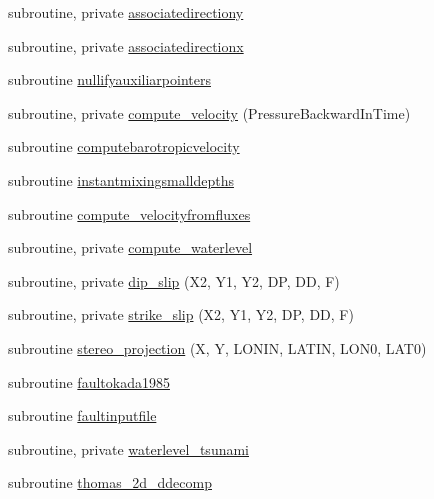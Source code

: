 \begin{DoxyCompactItemize}
subroutine, private \mbox{\hyperlink{namespacemodulehydrodynamic_ad1dd8c0a50f0deaee0d084b9938b1361}{associatedirectiony}}
\item 
subroutine, private \mbox{\hyperlink{namespacemodulehydrodynamic_a46e9869092f2ae2a7161f224fb8929e7}{associatedirectionx}}
\item 
subroutine \mbox{\hyperlink{namespacemodulehydrodynamic_a43c5994c86b411881eec077d6376cb07}{nullifyauxiliarpointers}}
\item 
subroutine, private \mbox{\hyperlink{namespacemodulehydrodynamic_aba4d9045d33fdc1b7b6011fd3fbb9c28}{compute\+\_\+velocity}} (Pressure\+Backward\+In\+Time)
\item 
subroutine \mbox{\hyperlink{namespacemodulehydrodynamic_a4ced11a2f90a07418b9497e7e9b068b7}{computebarotropicvelocity}}
\item 
subroutine \mbox{\hyperlink{namespacemodulehydrodynamic_a2237f44be04f4c5aeac0890ddec1ce4b}{instantmixingsmalldepths}}
\item 
subroutine \mbox{\hyperlink{namespacemodulehydrodynamic_a264a587e27769271754a3a3a8979a9b8}{compute\+\_\+velocityfromfluxes}}
\item 
subroutine, private \mbox{\hyperlink{namespacemodulehydrodynamic_abe745b3932a59db4111fe2798a0c335d}{compute\+\_\+waterlevel}}
\item 
subroutine, private \mbox{\hyperlink{namespacemodulehydrodynamic_a95f2fab061ef070b4278d48f1e7028e2}{dip\+\_\+slip}} (X2, Y1, Y2, DP, DD, F)
\item 
subroutine, private \mbox{\hyperlink{namespacemodulehydrodynamic_a38a2568403edbdf1d10000f553f39252}{strike\+\_\+slip}} (X2, Y1, Y2, DP, DD, F)
\item 
subroutine \mbox{\hyperlink{namespacemodulehydrodynamic_a1d685e489f857af3dd0c69835d0b081d}{stereo\+\_\+projection}} (X, Y, L\+O\+N\+IN, L\+A\+T\+IN, L\+O\+N0, L\+A\+T0)
\item 
subroutine \mbox{\hyperlink{namespacemodulehydrodynamic_af90f1292b4b75aa67f18563e3030e056}{faultokada1985}}
\item 
subroutine \mbox{\hyperlink{namespacemodulehydrodynamic_a639b9213d8587d0f1a43c4b8f842d43f}{faultinputfile}}
\item 
subroutine, private \mbox{\hyperlink{namespacemodulehydrodynamic_af4cd55d170e7b64149a737b5bbe9951c}{waterlevel\+\_\+tsunami}}
\item 
subroutine \mbox{\hyperlink{namespacemodulehydrodynamic_ac03117b3b11b92ebf56eb60fad884b0b}{thomas\+\_\+2d\+\_\+ddecomp}}
\item 

\end{DoxyCompactItemize}
